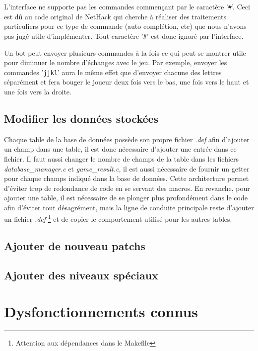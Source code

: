 \documentclass[10pt,a4paper]{report}
\begin{document}
L'interface ne supporte pas les commandes commençant par le caractère '\verb!#!'. Ceci est dû au code original de NetHack qui cherche à réaliser des traitements particuliers pour ce type de commande (auto complétion, etc) que nous n'avons pas jugé utile d'implémenter. Tout caractère '\verb!#!' est donc ignoré par l'interface.

Un bot peut envoyer plusieurs commandes à la fois ce qui peut se montrer utile pour diminuer le nombre d'échanges avec le jeu. Par exemple, envoyer les commandes '\verb!jjkl!' aura le même effet que d'envoyer chacune des lettres séparément et fera bouger le joueur deux fois vers le bas, une fois vers le haut et une fois vers la droite.

\section{Modifier les données stockées}
Chaque table de la base de données possède son propre fichier \emph{.def} afin
d'ajouter un champ dans une table, il est donc nécessaire d'ajouter une entrée
dans ce fichier. Il faut aussi changer le nombre de champs de la table dans les
fichiers \emph{database\_manager.c} et \emph{game\_result.c}, il est aussi
nécessaire de fournir un getter pour chaque champs indiqué dans la base de
données. Cette architecture permet d'éviter trop de redondance de code en se
servant des macros. En revanche, pour ajouter une table, il est nécessaire de se
plonger plus profondément dans le code afin d'éviter tout désagrément, mais la
ligne de conduite principale reste d'ajouter un fichier \emph{.def}
\footnote{Attention aux dépendances dans le Makefile} et de copier le
comportement utilisé pour les autres tables.

\section{Ajouter de nouveau patchs}

\section{Ajouter des niveaux spéciaux}

\chapter{Dysfonctionnements connus}
\end{document}
